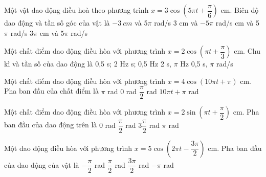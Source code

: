 \begin{vidu}%
Một vật dao động điều hoà theo phương trình $x = 3\cos(5\pi t + \dfrac{\pi}{6})$ cm. Biên độ dao động và tần số góc của vật là
\choice
{$-3\ cm$ và 5$\pi$ rad/s}
{3 cm và $-5\pi$ rad/s}
{ cm và 5$\pi$ rad/s}
{$3\pi$ cm và 5$\pi$ rad/s}
\end{vidu} %

\begin{vidu} %
Một chất điểm dao động điều hòa với phương trình $x = 2\cos(\pi t + \dfrac{\pi}{3})$ cm. Chu kì và tần số của dao động là
\choice
{0,5 s; 2 Hz}
{ s; 0,5 Hz}
{2 s, $\pi$ Hz}
{0,5 s, $\pi$ rad/s}

\end{vidu} %

\begin{vidu}%
Một chất điểm dao động điều hòa với phương trình $x = 4\cos(10\pi t + \pi)$ cm. Pha ban đầu của chất điểm là
\choice
{\True $\pi$ rad}
{$0$ rad}
{$\dfrac{\pi}{2}$ rad}
{$10\pi t + \pi$ rad}
\end{vidu} %

\begin{vidu} %
Một chất điểm dao động điều hòa với phương trình $x = 2\sin\left(\pi t + \dfrac{\pi}{2}\right)$ cm. Pha ban đầu của dao động trên là
\choice
{\True $0$ rad}
{$\dfrac{\pi}{2}$ rad}
{$3\dfrac{\pi}{2}$ rad}
{$\pi$ rad}
\end{vidu} %



\begin{vidu} %
Một dao động điều hòa với phương trình $x = 5\cos\left(2\pi t - \dfrac{3\pi}{2}\right)$ cm. Pha ban đầu của dao động của vật là
\choice
{$-\dfrac{\pi}{2}$ rad}
{\True $\dfrac{\pi}{2}$ rad}
{$\dfrac{3\pi}{2}$ rad}
{$-\pi$ rad}
\end{vidu} %

